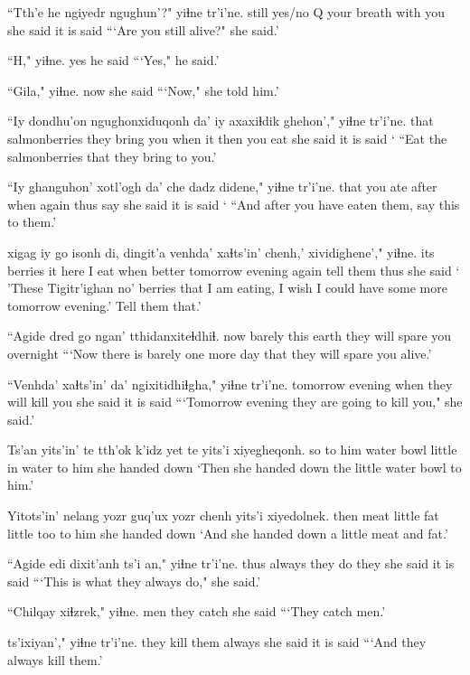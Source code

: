 \documentclass[12pt]{article}
\begin{document}
\gll ``Tth'e he ngiyedr ngughun'?"  yiɬne  tr'i'ne.
still  {yes/no Q} {your breath} {with you} {she said} {it is said}
\glt ```Are you still alive?" she said.'
\glend

\gll ``H," yiɬne.
yes  {he said}
\glt ```Yes," he said.'
\glend

\gll ``Gila," yiɬne.
now {she said}
\glt ```Now," she told him.'
\glend

\gll ``Iy dondhu'on ngughonxiduqonh da' iy axaxiɬdik ghehon'," yiɬne  tr'i'ne.
that salmonberries {they bring you} when it then {you eat} {she said} {it is said}
\glt ` ``Eat the salmonberries that they bring to you.'
\glend

\gll ``Iy ghanguhon' xotl'ogh da' che dadz didene," yiɬne  tr'i'ne.
that {you ate} after  when again thus say  {she said} {it is said}
\glt ` ``And after you have eaten them, say this to them.'
\glend

 xigag  iy go isonh di, dingit'a venhda' xaɬts'in' chenh,' xividighene',"  yiɬne.
{} {its berries} it here {I eat} when better  tomorrow evening again {tell them thus} {she said}
\glt ` 'These Tigitr'ighan no' berries that I am eating, I wish I could have some more tomorrow evening.' Tell them that.'
\glend

\gll ``Agide dred go ngan'  tthidanxiteɬdhiɬ.
now  barely this earth {they will spare you overnight}
\glt ```Now there is barely one more day that they will spare you alive.'
\glend

\gll ``Venhda' xaɬts'in' da' ngixitidhiɬgha," yiɬne  tr'i'ne.
tomorrow evening when {they will kill you} {she said} {it is said}
\glt ```Tomorrow evening they are going to kill you," she said.'
\glend

\gll Ts'an yits'in' te tth'ok k'idz yet te yits'i xiyegheqonh.
so {to him} water bowl little in water {to him} {she handed down}
\glt `Then she handed down the little water bowl to him.'
\glend

\gll Yitots'in' nelang yozr guq'ux yozr chenh yits'i xiyedolnek.
then  meat little fat little too {to him} {she handed down}
\glt `And she handed down a little meat and fat.'
\glend

\gll ``Agide edi dixit'anh ts'i an," yiɬne  tr'i'ne.
thus  always {they do} {} they {she said} {it is said}
\glt ```This is what they always do," she said.'
\glend

\gll ``Chilqay xiɬzrek," yiɬne.
men  {they catch} {she said}
\glt ```They catch men.'
\glend

 ts'ixiyan'," yiɬne  tr'i'ne.
{they kill them} always {she said} {it is said}
\glt ```And they always kill them.'
\glend
\end{document}

